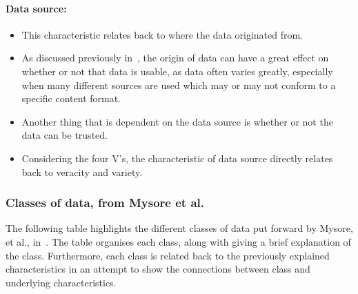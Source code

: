 \documentclass[a4paper,11pt]{article}
\begin{document}
\paragraph{Data source:}

\begin{itemize}
  \item This characteristic relates back to where the data originated from.
  \item As discussed previously in~, the origin of data can have a great effect on whether or not
  that data is usable, as data often varies greatly, especially when many different sources are used which may or may
  not conform to a specific content format.
  \item Another thing that is dependent on the data source is whether or not the data can be trusted.
  \item Considering the four V's, the characteristic of data source directly relates back to veracity and variety.
\end{itemize}




\subsubsection{Classes of data, from Mysore et al.} %
\label{ssub:data_classification}

The following table highlights the different classes of data put forward by Mysore, et al., in~\cite{ibm_big_2013}.
The table organises each class, along with giving a brief explanation of the class. Furthermore, each class is related
back to the previously explained characteristics in an attempt to show the connections between class and underlying
characteristics.
\end{document}
